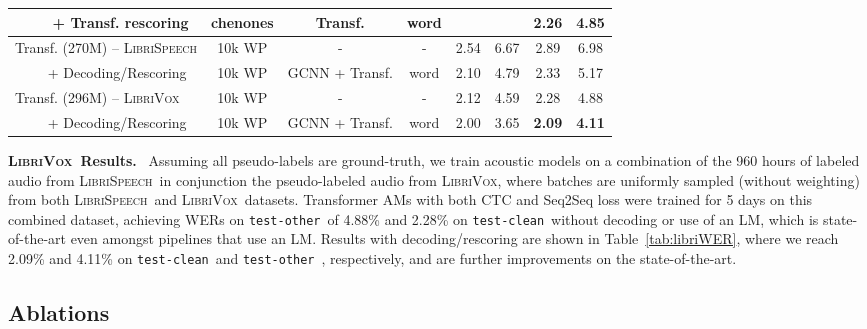 \documentclass{article}
\def\testclean{\texttt{test-clean}}
\def\testother{\texttt{test-other}}
\newcommand{\librivox}{\textsc{LibriVox}}
\newcommand{\librispeech}{\textsc{LibriSpeech}}
\begin{document}
\begin{table*}[!t]
\begin{small}
\begin{sc}
\begin{tabular}{lccccccc}
    ~~~~ + Transf. rescoring & chenones & Transf. & word & & & 2.26 & 4.85 \\
    \midrule
    Transf. (270M) -- \librispeech & 10k WP  & - & - & 2.54 & 6.67 & 2.89 & 6.98 \\
    ~~~~ + Decoding/Rescoring & 10k WP & GCNN + Transf. & word & 2.10 & 4.79 & 2.33 & 5.17 \\
    Transf. (296M) -- \librivox & 10k WP & - & - & 2.12 & 4.59 & 2.28 & 4.88 \\
    ~~~~ + Decoding/Rescoring & 10k WP  & GCNN + Transf. & word & 2.00 & 3.65 & \textbf{2.09} & \textbf{4.11} \\
    \bottomrule
\end{tabular}     \end{sc}
\end{small}
\vskip -0.1in
\end{table*}

\textbf{\librivox~Results.}~
Assuming all pseudo-labels are ground-truth, we train acoustic models on a combination of the 960 hours of labeled audio from \librispeech~in conjunction the pseudo-labeled audio from \librivox, where batches are uniformly sampled (without weighting) from both \librispeech~and \librivox~datasets. Transformer AMs with both CTC and Seq2Seq loss were trained for 5 days on this combined dataset, achieving WERs on \testother~of 4.88\% and 2.28\% on \testclean~without decoding or use of an LM, which is state-of-the-art even amongst pipelines that use an LM. Results with decoding/rescoring are shown in Table~\ref{tab:libriWER}, where we reach 2.09\% and 4.11\% on \testclean~and \testother~, respectively, and are further improvements on the state-of-the-art.

\subsection{Ablations}
\label{sec:ablations}
\end{document}
